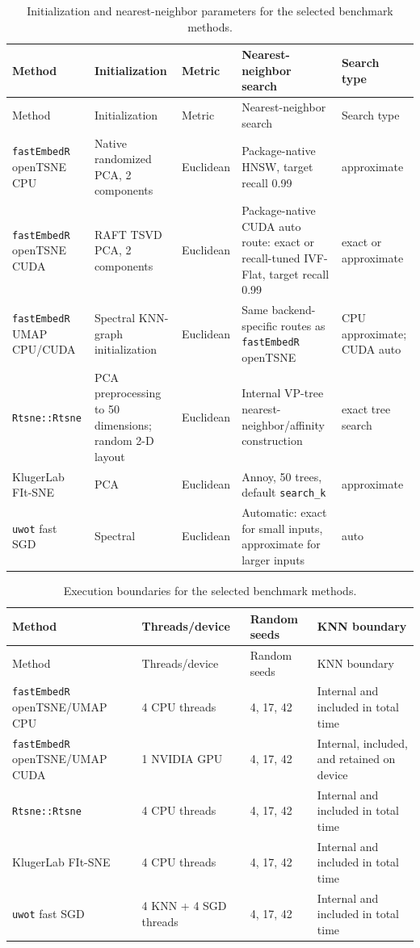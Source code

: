 \documentclass[twoside,11pt]{article}
\newcommand{\pkg}{\texttt{fastEmbedR}}
\begin{document}
\begingroup
\footnotesize
\setlength{\tabcolsep}{2.5pt}
\begin{longtable}{p{}p{}p{}p{}p{}}
\caption{Initialization and nearest-neighbor parameters for the selected benchmark methods.}\label{tab:search-parameters}\\
\toprule
Method & Initialization & Metric & Nearest-neighbor search & Search type\\
\midrule
\endfirsthead
\toprule
Method & Initialization & Metric & Nearest-neighbor search & Search type\\
\midrule
\endhead
\pkg{} openTSNE CPU & Native randomized PCA, 2 components & Euclidean & Package-native HNSW, target recall 0.99 & approximate\\
\pkg{} openTSNE CUDA & RAFT TSVD PCA, 2 components & Euclidean & Package-native CUDA auto route: exact or recall-tuned IVF-Flat, target recall 0.99 & exact or approximate\\
\pkg{} UMAP CPU/CUDA & Spectral KNN-graph initialization & Euclidean & Same backend-specific routes as \pkg{} openTSNE & CPU approximate; CUDA auto\\
\texttt{Rtsne::Rtsne} & PCA preprocessing to 50 dimensions; random 2-D layout & Euclidean & Internal VP-tree nearest-neighbor/affinity construction & exact tree search\\
KlugerLab FIt-SNE & PCA & Euclidean & Annoy, 50 trees, default \texttt{search\_k} & approximate\\
\texttt{uwot} fast SGD & Spectral & Euclidean & Automatic: exact for small inputs, approximate for larger inputs & auto\\
\bottomrule
\end{longtable}
\endgroup

\begingroup
\footnotesize
\setlength{\tabcolsep}{3pt}
\begin{longtable}{p{}p{}p{}p{}}
\caption{Execution boundaries for the selected benchmark methods.}\label{tab:execution-parameters}\\
\toprule
Method & Threads/device & Random seeds & KNN boundary\\
\midrule
\endfirsthead
\toprule
Method & Threads/device & Random seeds & KNN boundary\\
\midrule
\endhead
\pkg{} openTSNE/UMAP CPU & 4 CPU threads & 4, 17, 42 & Internal and included in total time\\
\pkg{} openTSNE/UMAP CUDA & 1 NVIDIA GPU & 4, 17, 42 & Internal, included, and retained on device\\
\texttt{Rtsne::Rtsne} & 4 CPU threads & 4, 17, 42 & Internal and included in total time\\
KlugerLab FIt-SNE & 4 CPU threads & 4, 17, 42 & Internal and included in total time\\
\texttt{uwot} fast SGD & 4 KNN + 4 SGD threads & 4, 17, 42 & Internal and included in total time\\
\bottomrule
\end{longtable}
\endgroup
\end{document}
